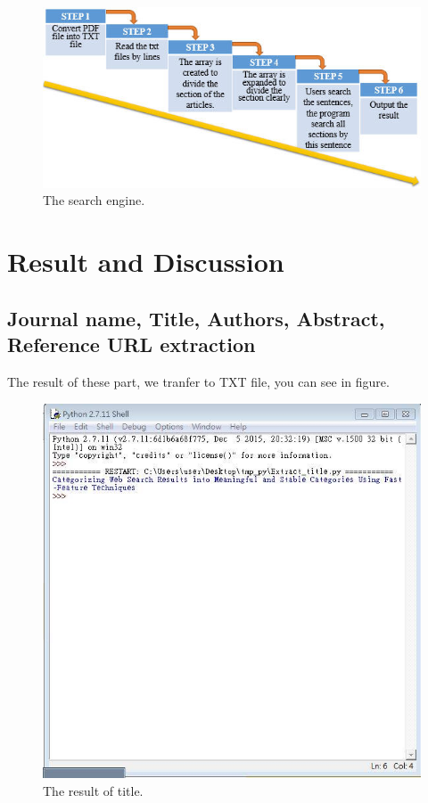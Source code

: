 \begin{figure}[tbh]
	\begin{center}
		\includegraphics[width=\columnwidth]{Union_Method_Chart_Search engine}
	\end{center}
	\caption{The search engine.}
	\end{figure}
	
\section*{Result and Discussion}
	\subsection*{Journal name, Title, Authors, Abstract, Reference URL extraction}
	The result of these part, we tranfer to TXT file, you can see in figure.

	\begin{figure}[tbh]
		\begin{center}
			\includegraphics[width=\columnwidth]{Union_Result_Chart_Title}
		\end{center}
		\caption{The result of title.}
	\end{figure}
	
